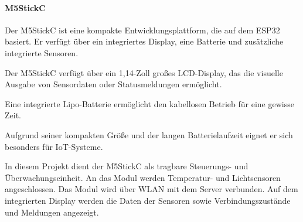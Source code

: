 \documentclass[12pt, letterpaper]{article}
\begin{document}
  \paragraph{M5StickC}
  \par \textbf{}
  \par Der M5StickC \cite{m5stickc} ist eine kompakte Entwicklungsplattform, die auf dem ESP32 basiert. Er verfügt über ein integriertes Display, eine Batterie und zusätzliche integrierte Sensoren.
  \par Der M5StickC verfügt über ein 1,14-Zoll großes LCD-Display, das die visuelle Ausgabe von Sensordaten oder Statusmeldungen ermöglicht. 
 \par Eine integrierte Lipo-Batterie ermöglicht den kabellosen Betrieb für eine gewisse Zeit.
  \par Aufgrund seiner kompakten Größe und der langen Batterielaufzeit eignet er sich besonders für IoT-Systeme. 
  \par In diesem Projekt dient der M5StickC als tragbare Steuerungs- und Überwachungseinheit. An das Modul werden Temperatur- und Lichtsensoren angeschlossen. Das Modul wird über WLAN mit dem Server verbunden. Auf dem integrierten Display werden die Daten der Sensoren sowie Verbindungszustände und Meldungen angezeigt. 
\end{document}
